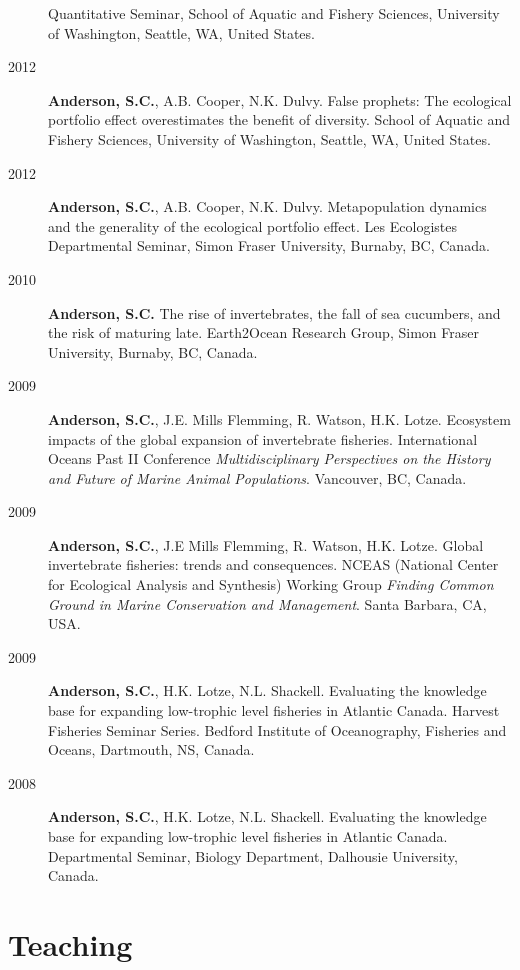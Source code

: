 \begin{description}
Quantitative Seminar, School of Aquatic and Fishery Sciences, University
of Washington, Seattle, WA, United States.
\item[2012]
\textbf{Anderson, S.C.}, A.B. Cooper, N.K. Dulvy. False prophets: The
ecological portfolio effect overestimates the benefit of diversity.
School of Aquatic and Fishery Sciences, University of Washington,
Seattle, WA, United States.
\item[2012]
\textbf{Anderson, S.C.}, A.B. Cooper, N.K. Dulvy. Metapopulation
dynamics and the generality of the ecological portfolio effect. Les
Ecologistes Departmental Seminar, Simon Fraser University, Burnaby, BC,
Canada.
\item[2010]
\textbf{Anderson, S.C.} The rise of invertebrates, the fall of sea
cucumbers, and the risk of maturing late. Earth2Ocean Research Group,
Simon Fraser University, Burnaby, BC, Canada.
\item[2009]
\textbf{Anderson, S.C.}, J.E. Mills Flemming, R. Watson, H.K. Lotze.
Ecosystem impacts of the global expansion of invertebrate fisheries.
International Oceans Past II Conference \emph{Multidisciplinary
Perspectives on the History and Future of Marine Animal Populations}.
Vancouver, BC, Canada.
\item[2009]
\textbf{Anderson, S.C.}, J.E Mills Flemming, R. Watson, H.K. Lotze.
Global invertebrate fisheries: trends and consequences. NCEAS (National
Center for Ecological Analysis and Synthesis) Working Group
\emph{Finding Common Ground in Marine Conservation and Management}.
Santa Barbara, CA, USA.
\item[2009]
\textbf{Anderson, S.C.}, H.K. Lotze, N.L. Shackell. Evaluating the
knowledge base for expanding low-trophic level fisheries in Atlantic
Canada. Harvest Fisheries Seminar Series. Bedford Institute of
Oceanography, Fisheries and Oceans, Dartmouth, NS, Canada.
\item[2008]
\textbf{Anderson, S.C.}, H.K. Lotze, N.L. Shackell. Evaluating the
knowledge base for expanding low-trophic level fisheries in Atlantic
Canada. Departmental Seminar, Biology Department, Dalhousie University,
Canada.
\end{description}

\hypertarget{teaching}{%
\section{Teaching}\label{teaching}}

